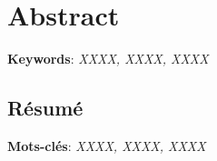 

\cleardoublepage
\chapter*{Abstract}

\vspace{2mm}
\vspace{2mm}

\lipsum[1]

\vspace{10mm}

\textbf{Keywords}: \textit{XXXX, XXXX, XXXX}


\begin{otherlanguage}{french}
\cleardoublepage
\chapter*{Résumé}

\vspace{2mm}
\vspace{2mm}

\lipsum[1]

\vspace{10mm}

\textbf{Mots-clés}: \textit{XXXX, XXXX, XXXX}

\end{otherlanguage}

